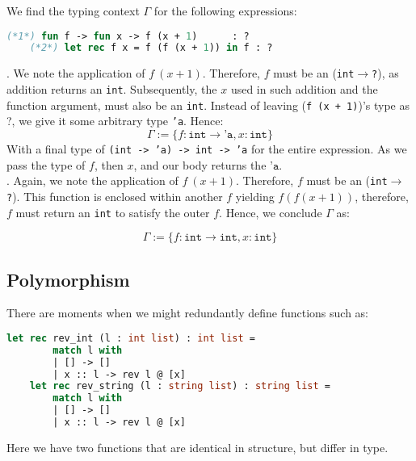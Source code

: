 \begin{Example}
    
    We find the typing context $\Gamma$ for the following expressions:
    \begin{lstlisting}[language=OCaml, numbers=none, mathescape=true]
    (*1*) fun f -> fun x -> f (x + 1)      : ?
    (*2*) let rec f x = f (f (x + 1)) in f : ?
    \end{lstlisting}
    
    . We note the application of $f\ (x + 1)$. Therefore, $f$ must be an (\texttt{int}$\to$\texttt{?}), as addition returns an \texttt{int}. Subsequently,
    the $x$ used in such addition and the function argument, must also be an \texttt{int}. Instead of leaving (\texttt{f (x + 1)})'s type as ?, we give it some arbitrary type \texttt{'a}. 
    Hence:
    $$\Gamma := \{f: \texttt{int} \to \texttt{'a}, x: \texttt{int}\}$$
    \noindent
    With a final type of \texttt{(int -> 'a) -> int -> 'a} for the entire expression. As we pass the type of $f$, then $x$, and our body returns the $\texttt{'a}$.\\

    . Again, we note the application of $f\ (x + 1)$. Therefore, $f$ must be an (\texttt{int}$\to$\texttt{?}). This function is enclosed
    within another $f$ yielding $f(f(x+1))$, therefore, $f$ must return an \texttt{int} to satisfy the outer $f$. Hence, we conclude $\Gamma$ as: 

    $$\Gamma := \{f: \texttt{int} \to \texttt{int}, x: \texttt{int}\}$$

\end{Example}

\subsection{Polymorphism}

\noindent
There are moments when we might redundantly define functions such as:

\begin{lstlisting}[language=OCaml, numbers=none]
    let rec rev_int (l : int list) : int list =
        match l with
        | [] -> []
        | x :: l -> rev l @ [x]
    let rec rev_string (l : string list) : string list =
        match l with
        | [] -> []
        | x :: l -> rev l @ [x]
\end{lstlisting}

\noindent
Here we have two functions that are identical in structure, but differ in type.

